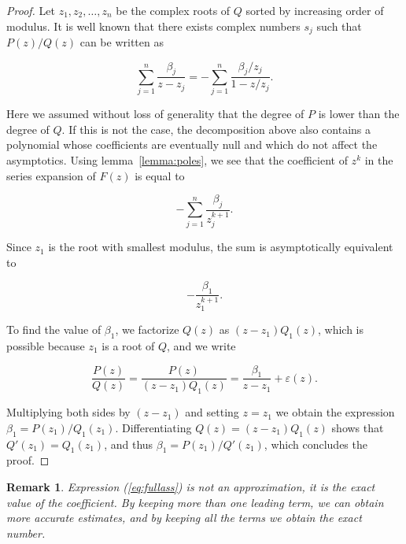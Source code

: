 \documentclass{article}
\newtheorem{remark}{Remark}
\begin{document}
\begin{proof}
Let $z_1, z_2, \ldots, z_n$ be the complex roots of $Q$ sorted by
increasing order of modulus. It is well known that there exists complex
numbers $s_j$ such that $P(z)/Q(z)$ can be written as

\begin{equation}
\sum_{j=1}^n \frac{\beta_j}{z-z_j} =
-\sum_{j=1}^n \frac{\beta_j/z_j}{1-z/z_j}.
\end{equation}

Here we assumed without loss of generality that the degree of $P$ is lower
than the degree of $Q$. If this is not the case, the decomposition above
also contains a polynomial whose coefficients are eventually null and
which do not affect the asymptotics. Using lemma~\ref{lemma:poles}, we see
that the coefficient of $z^k$ in the series expansion of $F(z)$ is equal
to

\begin{equation}
\label{eq:fullass}
-\sum_{j=1}^n \frac{\beta_j}{z_j^{k+1}}.
\end{equation}

Since $z_1$ is the root with smallest modulus, the sum is asymptotically
equivalent to

\begin{equation*}
-\frac{\beta_1}{z_1^{k+1}}.
\end{equation*}

To find the value of $\beta_1$, we factorize $Q(z)$ as
$(z-z_1)Q_1(z)$, which is possible because $z_1$ is a root of $Q$,
and we write

\begin{equation*}
\frac{P(z)}{Q(z)} =
\frac{P(z)}{(z-z_1)Q_1(z)} = \frac{\beta_1}{z-z_1} +
\varepsilon(z).
\end{equation*}

Multiplying both sides by $(z-z_1)$ and setting $z = z_1$ we obtain the
expression $\beta_1 = P(z_1) / Q_1(z_1)$.  Differentiating $Q(z) =
(z-z_1)Q_1(z)$ shows that $Q'(z_1) = Q_1(z_1)$, and thus $\beta_1 = P(z_1)
/ Q'(z_1)$, which concludes the proof.
\end{proof}

\begin{remark}
Expression (\ref{eq:fullass}) is not an approximation, it is the exact
value of the coefficient. By keeping more than one leading term, we can
obtain more accurate estimates, and by keeping all the terms we obtain the
exact number.
\end{remark}
\end{document}
